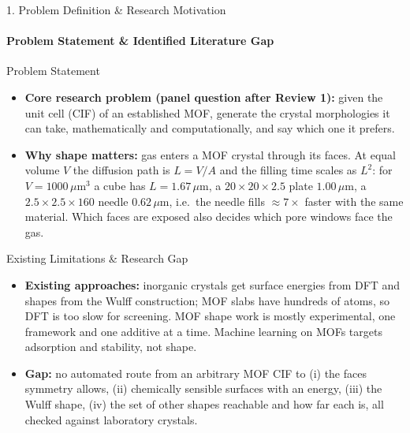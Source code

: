 \documentclass[aspectratio=169, 11pt]{beamer}
\begin{document}
\begin{frame}[shrink=4]{1. Problem Definition \& Research Motivation}
    \framesubtitle{Problem Statement \& Identified Literature Gap}
    \scriptsize
    \begin{block}{Problem Statement}
        \begin{itemize}
            \item \textbf{Core research problem (panel question after Review 1):} given the unit cell (CIF) of an established MOF, generate the crystal morphologies it can take, mathematically and computationally, and say which one it prefers.
            \item \textbf{Why shape matters:} gas enters a MOF crystal through its faces. At equal volume $V$ the diffusion path is $L = V/A$ and the filling time scales as $L^2$: for $V = 1000\,\mu$m$^3$ a cube has $L = 1.67\,\mu$m, a $20{\times}20{\times}2.5$ plate $1.00\,\mu$m, a $2.5{\times}2.5{\times}160$ needle $0.62\,\mu$m, i.e.\ the needle fills $\approx 7\times$ faster with the same material. Which faces are exposed also decides which pore windows face the gas.
        \end{itemize}
    \end{block}
    \begin{block}{Existing Limitations \& Research Gap}
        \begin{itemize}
            \item \textbf{Existing approaches:} inorganic crystals get surface energies from DFT and shapes from the Wulff construction; MOF slabs have hundreds of atoms, so DFT is too slow for screening. MOF shape work is mostly experimental, one framework and one additive at a time. Machine learning on MOFs targets adsorption and stability, not shape.
            \item \textbf{Gap:} no automated route from an arbitrary MOF CIF to (i) the faces symmetry allows, (ii) chemically sensible surfaces with an energy, (iii) the Wulff shape, (iv) the set of other shapes reachable and how far each is, all checked against laboratory crystals.
        \end{itemize}
    \end{block}
\end{frame}
\end{document}
